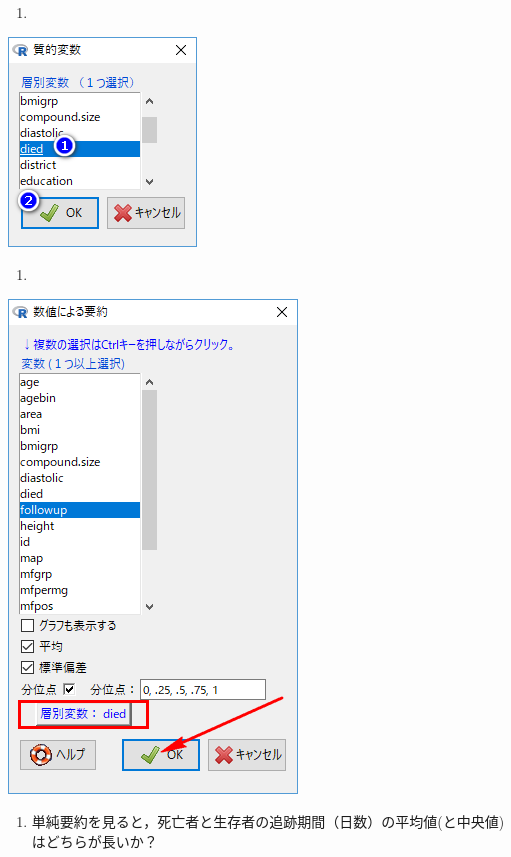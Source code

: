 \documentclass[]{problemset}
\providecommand{\tightlist}{%
  \setlength{\itemsep}{0pt}\setlength{\parskip}{0pt}}
\begin{document}
\newpage

\begin{enumerate}
\def\labelenumi{\arabic{enumi}.}
\setcounter{enumi}{4}
\item
\end{enumerate}

\begin{center}\includegraphics[width=0.25\linewidth,height=0.35\textheight]{pic/survival04} \end{center}

\begin{enumerate}
\def\labelenumi{\arabic{enumi}.}
\setcounter{enumi}{5}
\item
\end{enumerate}

\begin{center}\includegraphics[width=0.45\linewidth,height=0.35\textheight]{pic/survival05} \end{center}

\begin{enumerate}
\def\labelenumi{\arabic{enumi}.}
\setcounter{enumi}{6}
\tightlist
\item
  単純要約を見ると，死亡者と生存者の追跡期間（日数）の平均値(と中央値)はどちらが長いか？
\end{enumerate}
\end{document}
